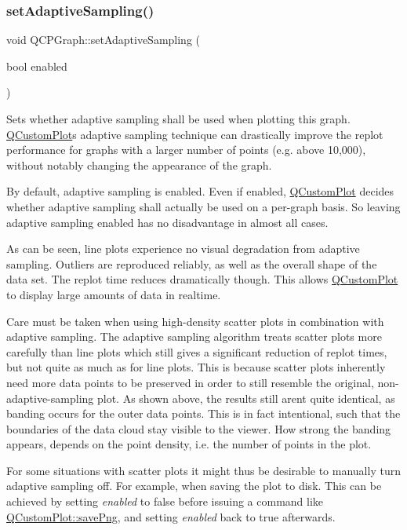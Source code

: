 \subsubsection{\texorpdfstring{setAdaptiveSampling()}{setAdaptiveSampling()}}
{\footnotesize\ttfamily void Q\+C\+P\+Graph\+::set\+Adaptive\+Sampling (\begin{DoxyParamCaption}\item[{bool}]{enabled }\end{DoxyParamCaption})}

Sets whether adaptive sampling shall be used when plotting this graph. \mbox{\hyperlink{class_q_custom_plot}{Q\+Custom\+Plot}}\textquotesingle{}s adaptive sampling technique can drastically improve the replot performance for graphs with a larger number of points (e.\+g. above 10,000), without notably changing the appearance of the graph.

By default, adaptive sampling is enabled. Even if enabled, \mbox{\hyperlink{class_q_custom_plot}{Q\+Custom\+Plot}} decides whether adaptive sampling shall actually be used on a per-\/graph basis. So leaving adaptive sampling enabled has no disadvantage in almost all cases.

 As can be seen, line plots experience no visual degradation from adaptive sampling. Outliers are reproduced reliably, as well as the overall shape of the data set. The replot time reduces dramatically though. This allows \mbox{\hyperlink{class_q_custom_plot}{Q\+Custom\+Plot}} to display large amounts of data in realtime.

 Care must be taken when using high-\/density scatter plots in combination with adaptive sampling. The adaptive sampling algorithm treats scatter plots more carefully than line plots which still gives a significant reduction of replot times, but not quite as much as for line plots. This is because scatter plots inherently need more data points to be preserved in order to still resemble the original, non-\/adaptive-\/sampling plot. As shown above, the results still aren\textquotesingle{}t quite identical, as banding occurs for the outer data points. This is in fact intentional, such that the boundaries of the data cloud stay visible to the viewer. How strong the banding appears, depends on the point density, i.\+e. the number of points in the plot.

For some situations with scatter plots it might thus be desirable to manually turn adaptive sampling off. For example, when saving the plot to disk. This can be achieved by setting {\itshape enabled} to false before issuing a command like \mbox{\hyperlink{class_q_custom_plot_ac92cc9256d12f354b40a4be4600b5fb9}{Q\+Custom\+Plot\+::save\+Png}}, and setting {\itshape enabled} back to true afterwards. \mbox{\label{class_q_c_p_graph_a2d03156df1b64037a2e36cfa50351ca3}} 
